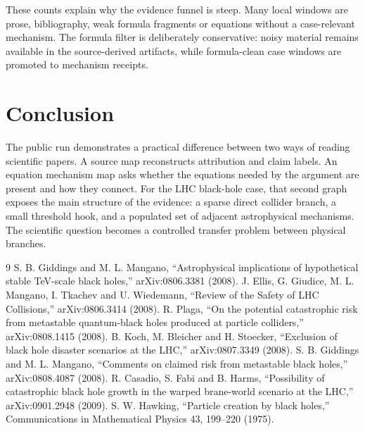 \documentclass[11pt]{article}
\begin{document}
These counts explain why the evidence funnel is steep. Many local windows are
prose, bibliography, weak formula fragments or equations without a case-relevant
mechanism. The formula filter is deliberately conservative: noisy material remains
available in the source-derived artifacts, while formula-clean case windows are
promoted to mechanism receipts.

\section{Conclusion}

	The public run demonstrates a practical difference between two ways of reading
	scientific papers. A source map reconstructs attribution and claim labels. An
	equation mechanism map asks whether the equations needed by the argument are
	present and how they connect.
For the LHC black-hole case, that second graph exposes the main structure of the
	evidence: a sparse direct collider branch, a small threshold hook, and a populated
	set of adjacent astrophysical mechanisms. The scientific question becomes a
	controlled transfer problem between physical branches.

\begin{thebibliography}{9}
 S. B. Giddings and M. L. Mangano, ``Astrophysical implications of hypothetical stable TeV-scale black holes,'' arXiv:0806.3381 (2008).
 J. Ellis, G. Giudice, M. L. Mangano, I. Tkachev and U. Wiedemann, ``Review of the Safety of LHC Collisions,'' arXiv:0806.3414 (2008).
 R. Plaga, ``On the potential catastrophic risk from metastable quantum-black holes produced at particle colliders,'' arXiv:0808.1415 (2008).
 B. Koch, M. Bleicher and H. Stoecker, ``Exclusion of black hole disaster scenarios at the LHC,'' arXiv:0807.3349 (2008).
 S. B. Giddings and M. L. Mangano, ``Comments on claimed risk from metastable black holes,'' arXiv:0808.4087 (2008).
 R. Casadio, S. Fabi and B. Harms, ``Possibility of catastrophic black hole growth in the warped brane-world scenario at the LHC,'' arXiv:0901.2948 (2009).
 S. W. Hawking, ``Particle creation by black holes,'' Communications in Mathematical Physics 43, 199--220 (1975).
\end{thebibliography}
\end{document}
